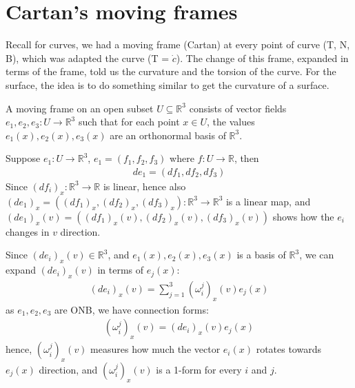 \documentclass[10pt]{article}
\begin{document}
        \newpage
        \section{Cartan's moving frames}\label{Sec:Cartan's moving frames}
		Recall for curves, we had a moving frame (Cartan) at every point of curve (T, N, B), which was adapted the curve (T = $\dot{c}$). The change of this frame, expanded in terms of the frame, told us the curvature and the torsion of the  curve. For the surface, the idea is to do something similar to get the curvature of a surface.
		
		\begin{definition}
			A moving frame on an open subset $U\subseteq\mathbb{R}^3$ consists of vector fields $e_1, e_2, e_3: U\rightarrow\mathbb{R}^3$ such that for each point $x\in U$, the values $e_1(x), e_2(x), e_3(x)$ are an orthonormal basis of $\mathbb{R}^3$.
		\end{definition}
	
		\begin{definition}
			Suppose $e_1: U\rightarrow\mathbb{R}^3$, $e_1 = (f_1, f_2, f_3)$ where $f: U\rightarrow\mathbb{R}$, then
			\begin{equation*}
				\begin{aligned}
					de_1 = (df_1, df_2, df_3)
				\end{aligned}
			\end{equation*}
			Since $(df_i)_x: \mathbb{R}^3\rightarrow\mathbb{R}$ is linear, hence also $(de_1)_x = ((df_1)_x, (df_2)_x, (df_3)_x): \mathbb{R}^3\rightarrow\mathbb{R}^3$ is a linear map,  and $(de_1)_x(v) = ((df_1)_x(v), (df_2)_x(v), (df_3)_x(v))$ shows how the $e_i$ changes in $v$ direction.
		\end{definition}
	
		\begin{definition}
			Since $(de_i)_x(v)\in\mathbb{R}^3$, and $e_1(x), e_2(x), e_3(x)$ is a basis of $\mathbb{R}^3$, we can expand $(de_i)_x(v)$ in terms of $e_j(x)$:
			\begin{equation*}
				\begin{aligned}
					(de_i)_x(v) = \sum\limits_{j=1}^3(\omega_i^j)_x(v)e_j(x)
				\end{aligned}
			\end{equation*}
			as $e_1, e_2, e_3$ are ONB, we have connection forms:
			\begin{equation*}
				\begin{aligned}
					(\omega_i^j)_x(v) = (de_i)_x(v)e_j(x)
				\end{aligned}
			\end{equation*}
			hence, $(\omega_i^j)_x(v)$ measures how much the vector $e_i(x)$ rotates towards $e_j(x)$ direction, and $(\omega_i^j)_x(v)$ is a 1-form for every $i$ and $j$.
		\end{definition}
		
\end{document}
